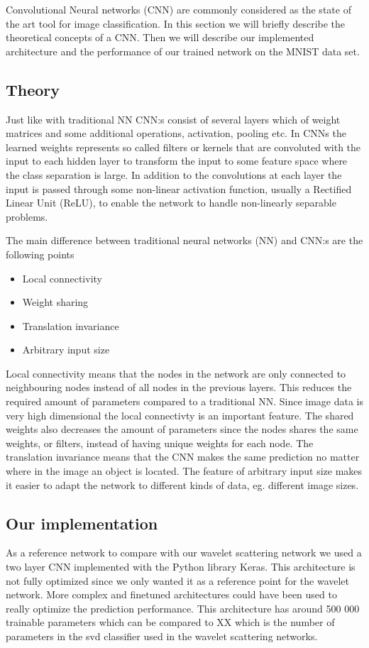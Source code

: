 \documentclass[12pt,a4paper]{article}
\theoremstyle{remark}
\begin{document}
Convolutional Neural networks (CNN) are commonly considered as the state of the art tool for image classification. In this section we will briefly describe the theoretical concepts of a CNN. Then we will describe our implemented architecture and the performance of our trained network on the MNIST data set.
\subsection{Theory} %
Just like with traditional NN CNN:s consist of several layers which of weight matrices and some additional operations, activation, pooling etc. In CNNs the learned weights represents  so called filters or kernels that are convoluted with the input to each hidden layer to transform the input to some feature space where the class separation is large. In addition to the convolutions at each layer the input is passed through some non-linear activation function, usually a Rectified Linear Unit (ReLU), to enable the network to handle non-linearly separable problems. 

The main difference between traditional neural networks (NN) and CNN:s are the following points

\begin{itemize}
\item Local connectivity 
\item Weight sharing
\item Translation invariance
\item Arbitrary input size
\end{itemize}

Local connectivity means that the nodes in the network are only connected to neighbouring nodes instead of all nodes in the previous layers. This  reduces the required amount of parameters compared to a traditional NN. Since image data is very high dimensional the local connectivty is an important feature. The shared weights also decreases the amount of parameters since the nodes shares the same weights, or filters, instead of having unique weights for each node. The translation invariance means that the CNN makes the same prediction no matter where in the image an object is located. The feature of arbitrary input size makes it easier to adapt the network to different kinds of data, eg. different image sizes. 

\subsection{Our implementation}
As a reference network to compare with our wavelet scattering network we used a two layer CNN implemented with the Python library Keras. This architecture is not fully optimized since we only wanted it as a reference point for the wavelet network. More complex and finetuned architectures could have been used to really optimize the prediction performance. This architecture has around 500 000 trainable parameters which can be compared to XX which is the number of parameters in the svd classifier used in the wavelet scattering networks. 
\end{document}

